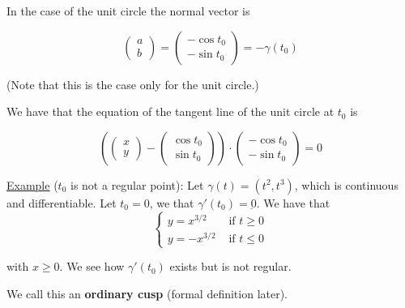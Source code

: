 \documentclass[10pt]{extarticle}
\begin{document}
In the case of the unit circle the normal vector is

$$
    \begin{pmatrix}
        a \\ b
    \end{pmatrix}
    =
    \begin{pmatrix}
        -\cos t_0 \\ -\sin t_0
    \end{pmatrix}
    =
    - \gamma(t_0)
$$

(Note that this is the case only for the unit circle.)

We have that the equation of the tangent line of the unit circle at $t_0$ is

$$
    \left(
    \begin{pmatrix}
            x \\ y
        \end{pmatrix} - \begin{pmatrix}
            \cos t_0 \\ \sin t_0
        \end{pmatrix}
    \right)
    \cdot
    \begin{pmatrix}
        -\cos t_0 \\ -\sin t_0
    \end{pmatrix}
    = 0
$$

\underline{Example} ($t_0$ is not a regular point):
Let $\gamma(t) = (t^2, t^3)$, which is continuous and differentiable.
Let $t_0 = 0$, we that $\gamma'(t_0) = \underbar{0}$.
We have that
$$
    \begin{cases}
        y = x^{3/2}  & \text{ if } t \geq 0 \\
        y = -x^{3/2} & \text{ if } t \leq 0
    \end{cases}
$$

with $x \geq 0$. We see how $\gamma'(t_0)$ exists but is not regular.

We call this an \textbf{ordinary cusp} (formal definition later).
\end{document}
